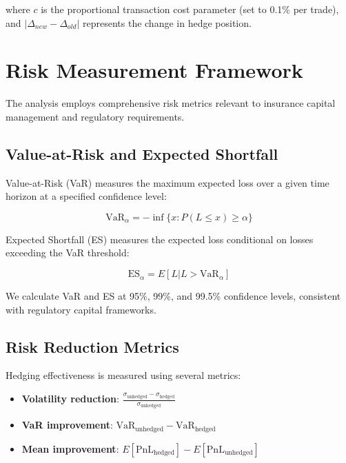 \documentclass[12pt,a4paper]{report}
\begin{document}
where $c$ is the proportional transaction cost parameter (set to 0.1\% per trade), and $|\Delta_{new} - \Delta_{old}|$ represents the change in hedge position.

\section{Risk Measurement Framework}

The analysis employs comprehensive risk metrics relevant to insurance capital management and regulatory requirements.

\subsection{Value-at-Risk and Expected Shortfall}

Value-at-Risk (VaR) measures the maximum expected loss over a given time horizon at a specified confidence level:

\begin{equation}
\text{VaR}_\alpha = -\inf\{x : P(L \leq x) \geq \alpha\}
\end{equation}

Expected Shortfall (ES) measures the expected loss conditional on losses exceeding the VaR threshold:

\begin{equation}
\text{ES}_\alpha = E[L | L > \text{VaR}_\alpha]
\end{equation}

We calculate VaR and ES at 95\%, 99\%, and 99.5\% confidence levels, consistent with regulatory capital frameworks.

\subsection{Risk Reduction Metrics}

Hedging effectiveness is measured using several metrics:

\begin{itemize}
\item \textbf{Volatility reduction}: $\frac{\sigma_{\text{unhedged}} - \sigma_{\text{hedged}}}{\sigma_{\text{unhedged}}}$
\item \textbf{VaR improvement}: $\text{VaR}_{\text{unhedged}} - \text{VaR}_{\text{hedged}}$
\item \textbf{Mean improvement}: $E[\text{PnL}_{\text{hedged}}] - E[\text{PnL}_{\text{unhedged}}]$
\end{itemize}
\end{document}

